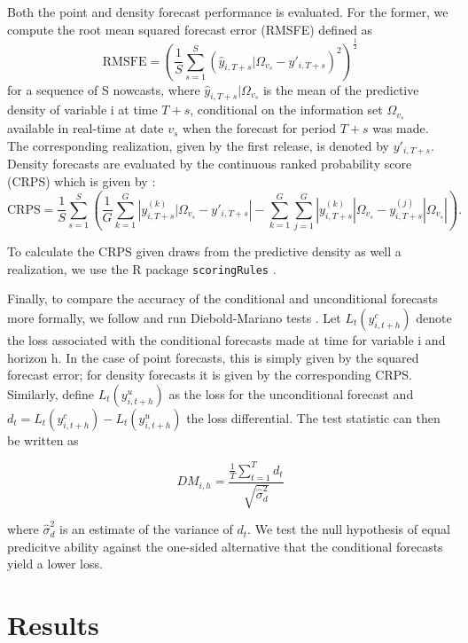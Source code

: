 \documentclass[notitlepage,a4paper,12pt]{article}
\begin{document}
Both the point and density forecast performance is evaluated. For the former, we compute the root mean squared forecast error (RMSFE) defined as
\begin{equation*}
\text{RMSFE} = \left( \frac{1}{S} \sum_{s=1}^S (\hat{y}_{i, T+s}|\Omega_{v_{s}} - y'_{i, T+s})^2 \right) ^{\frac{1}{2}}
\end{equation*}
for a sequence of S nowcasts, where $\hat{y}_{i, T+s}|\Omega_{v_{s}}$ is the mean of the predictive density of variable i at time $T+s$, conditional on the information set $\Omega_{v_s}$ available in real-time at date $v_s$ when the forecast for period $T+s$ was made. The corresponding realization, given by the first release, is denoted by $y'_{i,T+s}$. Density forecasts are evaluated by the continuous ranked probability score (CRPS) which is given by \citep[see][]{Gneitingetal2016}:
\begin{equation*}
\text{CRPS} = \frac{1}{S} \sum_{s=1}^{S} \left( \frac{1}{G} \sum_{k=1}^G \left\lvert {y}^{(k)}_{i,T+s}|\Omega_{v_{s}} - y'_{i, T+s} \right\rvert - \sum_{k=1}^G \sum_{j=1}^G \left\lvert {y}^{(k)}_{i,T+s}|\Omega_{v_{s}} - {y}^{(j)}_{i,T+s}|\Omega_{v_{s}} \right\rvert \right).
\end{equation*}

To calculate the CRPS given draws from the predictive density as well a realization, we use the R package \texttt{scoringRules} \citep{jkl_2019_jss}.

Finally, to compare the accuracy of the conditional and unconditional forecasts more formally, we follow \citet{ganicsodendahl_2021_ijf} and run Diebold-Mariano tests \citep{dm_1995_jbes}. Let $L_t(y^c_{i, t+h})$ denote the loss associated with the conditional forecasts made at time for variable i and horizon h. In the case of point forecasts, this is simply given by the squared forecast error; for density forecasts it is given by the corresponding CRPS. Similarly, define $L_t(y^u_{i, t+h})$ as the loss for the unconditional forecast and $d_t = L_t(y^c_{i, t+h}) - L_t(y^u_{i, t+h})$ the loss differential. The test statistic can then be written as 

$$
    DM_{i, h} = \frac{\frac{1}{T} \sum_{t=1}^{T} d_t}{\sqrt{\hat{\sigma}^2_d}}
$$

where $\hat{\sigma}^2_d$ is an estimate of the variance of $d_t$. We test the null hypothesis of equal predicitve ability against the one-sided alternative that the conditional forecasts yield a lower loss. 

\section{Results}
\end{document}
